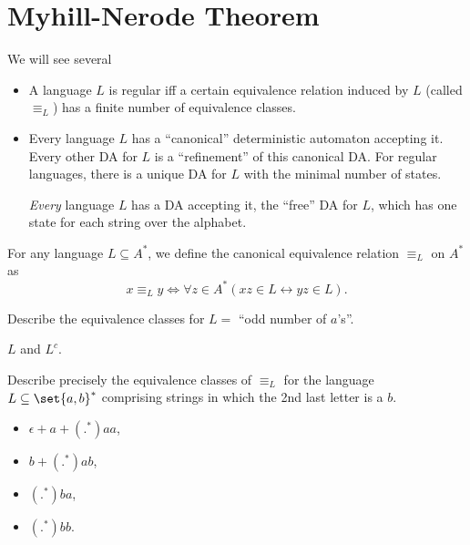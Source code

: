 \section{Myhill-Nerode Theorem} \label{sec:mn}
We will see several %
\begin{itemize}
    \item A language $L$ is regular iff a certain equivalence relation
    induced by $L$ (called $\equiv_L$) has a finite number of equivalence
    classes.
    \item Every language $L$ has a ``canonical'' deterministic automaton
    accepting it.
    Every other DA for $L$ is a ``refinement'' of this canonical DA.
    For regular languages, there is a unique DA for $L$ with the minimal
    number of states.
    \begin{remark}
        \emph{Every} language $L$ has a DA accepting it, the ``free'' DA for
        $L$, which has one state for each string over the alphabet.
    \end{remark}
\end{itemize}


\begin{definition*}
    For any language $L \subseteq A^*$, we define the canonical equivalence
    relation $\equiv_L$ on $A^*$ as \[
        x \equiv_L y \iff
            \forall z \in A^*(xz \in L \longleftrightarrow yz \in L).
    \]
\end{definition*}

\begin{exercise}
    Describe the equivalence classes for $L = $ ``odd number of $a$'s''.
\end{exercise}
\begin{solution}
    $L$ and $L^c$.
\end{solution}

\begin{exercise}
    Describe precisely the equivalence classes of $\equiv_L$ for the
    language $L \subseteq \set{a, b}^*$ comprising strings in which the 2nd
    last letter is a $b$.
\end{exercise}
\begin{solution} \leavevmode
    \begin{itemize}
        \item $\epsilon + a + (.^*)aa$,
        \item $b + (.^*)ab$,
        \item $(.^*)ba$,
        \item $(.^*)bb$. \qedhere
    \end{itemize}
\end{solution}

